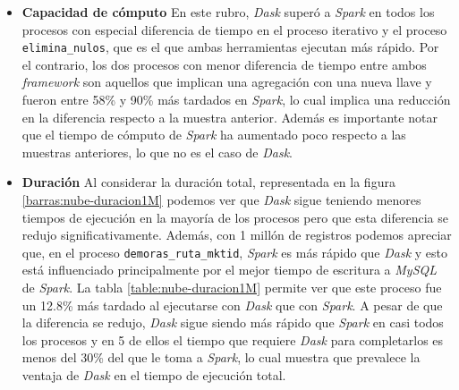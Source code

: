 \begin{itemize}
	\item \textbf{Capacidad de cómputo} En este rubro, \textit{Dask} superó a \textit{Spark} en todos los procesos con especial diferencia de tiempo en el proceso iterativo y el proceso \texttt{elimina\_nulos}, que es el que ambas herramientas ejecutan más rápido. Por el contrario, los dos procesos con menor diferencia de tiempo entre ambos \textit{framework} son aquellos que implican una agregación con una nueva llave y fueron entre 58\% y 90\% más tardados en \textit{Spark}, lo cual implica una reducción en la diferencia respecto a la muestra anterior. Además es importante notar que el tiempo de cómputo de \textit{Spark} ha aumentado poco respecto a las muestras anteriores, lo que no es el caso de \textit{Dask}.
	
	\item \textbf{Duración} Al considerar la duración total, representada en la figura \ref{barras:nube-duracion1M} podemos ver que \textit{Dask} sigue teniendo menores tiempos de ejecución en la mayoría de los procesos pero que esta diferencia se redujo significativamente. Además, con 1 millón de registros podemos apreciar que, en el proceso \texttt{demoras\_ruta\_mktid}, \textit{Spark} es más rápido que \textit{Dask} y esto está influenciado principalmente por el mejor tiempo de escritura a \textit{MySQL} de \textit{Spark}. La tabla \ref{table:nube-duracion1M} permite ver que este proceso fue un 12.8\% más tardado al ejecutarse con \textit{Dask} que con \textit{Spark}. A pesar de que la diferencia se redujo, \textit{Dask} sigue siendo más rápido que \textit{Spark} en casi todos los procesos y en 5 de ellos el tiempo que requiere \textit{Dask} para completarlos es menos del 30\% del que le toma a \textit{Spark}, lo cual muestra que prevalece la ventaja de \textit{Dask} en el tiempo de ejecución total.
\end{itemize}

